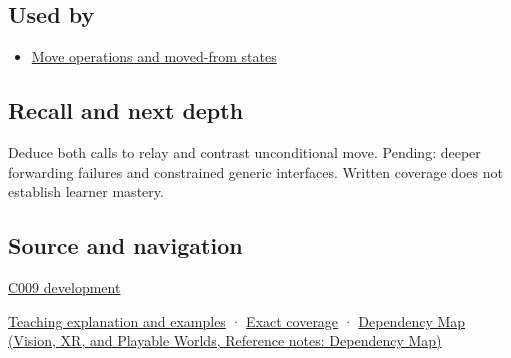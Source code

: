 \subsection{Used by}\label{appendix-0104b704fb11-used-by}

\hypertarget{appendix-0104b704fb11-used-by}{}

\begin{itemize}
\tightlist
\item
  \hyperref[appendix-5636651017c2]{Move operations and moved-from states}
\end{itemize}

\subsection{Recall and next depth}\label{appendix-0104b704fb11-recall-and-next-depth}

\hypertarget{appendix-0104b704fb11-recall-and-next-depth}{}

Deduce both calls to relay and contrast unconditional move. Pending: deeper forwarding failures and constrained generic interfaces. Written coverage does not establish learner mastery.

\subsection{Source and navigation}\label{appendix-0104b704fb11-source-and-navigation}

\hypertarget{appendix-0104b704fb11-source-and-navigation}{}

\hyperref[appendix-fd090d982a15-m009---parts-127-147]{C009 development}

\hyperref[01-foundations-i-ch003-move-permission-is-not-resource-transfer]{Teaching explanation and examples} · \hyperref[appendix-fd090d982a15-m008---parts-113-126]{Exact coverage} · \href{../07-Vision-XR-and-Playable-Worlds/main.pdf\#nameddest=appendix-4ad47bdd269a}{Dependency Map (Vision, XR, and Playable Worlds, Reference notes: Dependency Map)}
